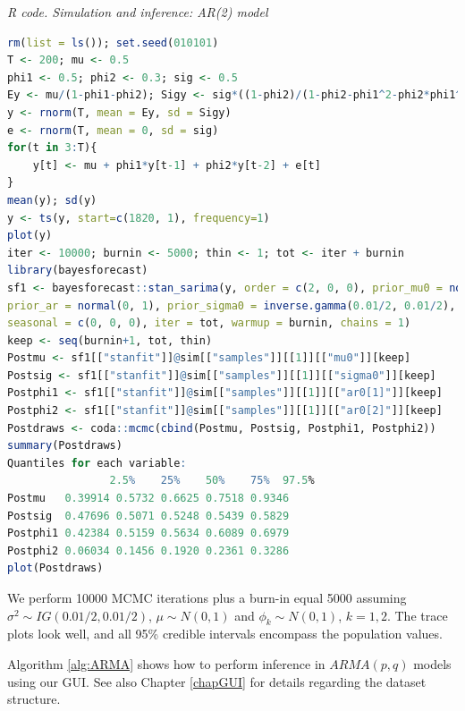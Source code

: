 \begin{tcolorbox}[enhanced,width=4.67in,center upper,
	fontupper=\large\bfseries,drop shadow southwest,sharp corners]
	\textit{R code. Simulation and inference: AR(2) model}
	\begin{VF}
		\begin{lstlisting}[language=R]
rm(list = ls()); set.seed(010101)
T <- 200; mu <- 0.5 
phi1 <- 0.5; phi2 <- 0.3; sig <- 0.5
Ey <- mu/(1-phi1-phi2); Sigy <- sig*((1-phi2)/(1-phi2-phi1^2-phi2*phi1^2-phi2^2+phi2^3))^0.5 
y <- rnorm(T, mean = Ey, sd = Sigy)
e <- rnorm(T, mean = 0, sd = sig)
for(t in 3:T){
	y[t] <- mu + phi1*y[t-1] + phi2*y[t-2] + e[t]
}
mean(y); sd(y)
y <- ts(y, start=c(1820, 1), frequency=1)
plot(y)
iter <- 10000; burnin <- 5000; thin <- 1; tot <- iter + burnin
library(bayesforecast)
sf1 <- bayesforecast::stan_sarima(y, order = c(2, 0, 0), prior_mu0 = normal(0, 1),
prior_ar = normal(0, 1), prior_sigma0 = inverse.gamma(0.01/2, 0.01/2),
seasonal = c(0, 0, 0), iter = tot, warmup = burnin, chains = 1)
keep <- seq(burnin+1, tot, thin)
Postmu <- sf1[["stanfit"]]@sim[["samples"]][[1]][["mu0"]][keep]
Postsig <- sf1[["stanfit"]]@sim[["samples"]][[1]][["sigma0"]][keep]
Postphi1 <- sf1[["stanfit"]]@sim[["samples"]][[1]][["ar0[1]"]][keep]
Postphi2 <- sf1[["stanfit"]]@sim[["samples"]][[1]][["ar0[2]"]][keep]
Postdraws <- coda::mcmc(cbind(Postmu, Postsig, Postphi1, Postphi2))
summary(Postdraws)
Quantiles for each variable:
            	2.5%    25%    50%    75%  97.5%
Postmu   0.39914 0.5732 0.6625 0.7518 0.9346
Postsig  0.47696 0.5071 0.5248 0.5439 0.5829
Postphi1 0.42384 0.5159 0.5634 0.6089 0.6979
Postphi2 0.06034 0.1456 0.1920 0.2361 0.3286
plot(Postdraws)
\end{lstlisting}
	\end{VF}
\end{tcolorbox}
We perform 10000 MCMC iterations plus a burn-in equal 5000 assuming $\sigma^2\sim IG(0.01/2, 0.01/2)$, $\mu\sim N(0, 1)$ and $\phi_k\sim N(0, 1)$, $k=1,2$. The trace plots look well, and all 95\% credible intervals encompass the population values.

Algorithm \ref{alg:ARMA} shows how to perform inference in $ARMA(p,q)$ models using our GUI. See also Chapter \ref{chapGUI} for details regarding the dataset structure. 

